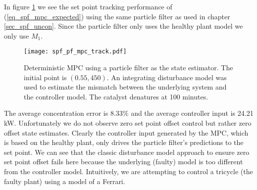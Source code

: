 In figure \ref{fig_spf_pf_mpc_track} we see the set point tracking performance of (\ref{eq_spf_mpc_expected}) using the same particle filter as used in chapter \ref{sec_spf_uncon}. Since the particle filter only uses the healthy plant model we only use $M_1$. 
\begin{figure}[H] 
\centering
\texttt{[image: spf\_pf\_mpc\_track.pdf]}
\caption{Deterministic MPC using a particle filter as the state estimator. The initial point is $(0.55, 450)$. An integrating disturbance model was used to estimate the mismatch between the underlying system and the controller model. The catalyst denatures at 100 minutes.}
\label{fig_spf_pf_mpc_track}
\end{figure}
The average concentration error is 8.33\% and the average controller input is 24.21 kW. Unfortunately we do not observe zero set point offset control but rather zero offset state estimates. Clearly the controller input generated by the MPC, which is based on the healthy plant, only drives the particle filter's predictions to the set point. We can see that the classic disturbance model approach \cite{lee} to ensure zero set point offset fails here because the underlying (faulty) model is too different from the controller model. Intuitively, we are attempting to control a tricycle (the faulty plant) using a model of a Ferrari.  


